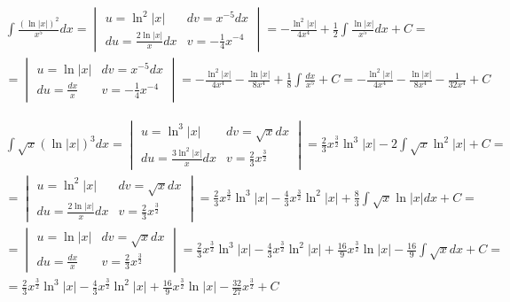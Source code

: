 
\begin{gather*}
  \int \frac{(\ln|x|)^2}{x^5}dx =
  \begin{vmatrix}
    u=\ln^2|x| & dv=x^{-5}dx \\
    du=\frac{2\ln|x|}{x}dx & v=-\frac{1}{4}x^{-4}
  \end{vmatrix}
  = -\frac{\ln^2|x|}{4x^4} + \frac{1}{2} \int \frac{\ln|x|}{x^5}dx + C = \\
  = \begin{vmatrix}
    u=\ln|x| & dv=x^{-5}dx \\
    du=\frac{dx}{x} & v=-\frac{1}{4}x^{-4}
  \end{vmatrix}
  = -\frac{\ln^2|x|}{4x^4} - \frac{\ln|x|}{8x^4} + \frac{1}{8} \int \frac{dx}{x^5} + C
  = -\frac{\ln^2|x|}{4x^4} - \frac{\ln|x|}{8x^4} - \frac{1}{32x^4} + C
\end{gather*}



\begin{gather*}
  \int \sqrt{x} (\ln|x|)^3 dx =
  \begin{vmatrix}
    u=\ln^3|x| & dv=\sqrt{x}dx \\
    du=\frac{3\ln^2|x|}{x}dx & v=\frac{2}{3}x^{\frac{3}{2}}
  \end{vmatrix}
  = \frac{2}{3}x^{\frac{3}{2}}\ln^3|x| - 2 \int \sqrt{x}\ln^2|x| + C = \\
  = \begin{vmatrix}
    u=\ln^2|x| & dv=\sqrt{x}dx \\
    du=\frac{2\ln|x|}{x}dx & v=\frac{2}{3}x^{\frac{3}{2}}
  \end{vmatrix}
  = \frac{2}{3}x^{\frac{3}{2}}\ln^3|x| - \frac{4}{3}x^{\frac{3}{2}}\ln^2|x| + \frac{8}{3}\int \sqrt{x}\ln|x|dx + C = \\
  = \begin{vmatrix}
    u=\ln|x| & dv=\sqrt{x}dx \\
    du=\frac{dx}{x} & v=\frac{2}{3}x^{\frac{3}{2}}
  \end{vmatrix}
  = \frac{2}{3}x^{\frac{3}{2}}\ln^3|x| - \frac{4}{3}x^{\frac{3}{2}}\ln^2|x| + \frac{16}{9}x^{\frac{3}{2}}\ln|x| - \frac{16}{9} \int \sqrt{x}dx + C = \\
  = \frac{2}{3}x^{\frac{3}{2}}\ln^3|x| - \frac{4}{3}x^{\frac{3}{2}}\ln^2|x| + \frac{16}{9}x^{\frac{3}{2}}\ln|x| - \frac{32}{27}x^{\frac{3}{2}} + C
\end{gather*}




